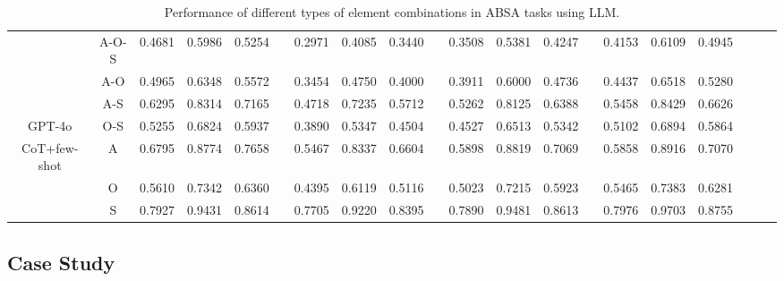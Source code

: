 \documentclass[11pt]{article}
\begin{document}
\begin{table}[ht]
{\begin{tabular}{cccccccccccccccccccc}
    \midrule
          & A-O-S & 0.4681 & 0.5986 & 0.5254 &       & 0.2971 & 0.4085 & 0.3440 &       & 0.3508 & 0.5381 & 0.4247 &       & 0.4153 & 0.6109 & 0.4945 \\
          & A-O   & 0.4965 & 0.6348 & 0.5572 &       & 0.3454 & 0.4750 & 0.4000   &       & 0.3911 & 0.6000   & 0.4736 &       & 0.4437 & 0.6518 & 0.5280 \\
          & A-S   & 0.6295 & 0.8314 & 0.7165 &       & 0.4718 & 0.7235 & 0.5712 &       & 0.5262 & 0.8125 & 0.6388 &       & 0.5458 & 0.8429 & 0.6626 \\
          GPT-4o & O-S   & 0.5255 & 0.6824 & 0.5937 &       & 0.3890 & 0.5347 & 0.4504 &       & 0.4527 & 0.6513 & 0.5342 &       & 0.5102 & 0.6894 & 0.5864 \\
          CoT+few-shot & A     & 0.6795 & 0.8774 & 0.7658 &       & 0.5467 & 0.8337 & 0.6604 &       & 0.5898 & 0.8819 & 0.7069 &       & 0.5858 & 0.8916 & 0.7070 \\
          & O     & 0.5610 & 0.7342 & 0.6360 &       & 0.4395 & 0.6119 & 0.5116 &       & 0.5023 & 0.7215 & 0.5923 &       & 0.5465 & 0.7383 & 0.6281 \\
          & S     & 0.7927 & 0.9431 & 0.8614 &       & 0.7705 & 0.9220 & 0.8395 &       & 0.7890 & 0.9481 & 0.8613 &       & 0.7976 & 0.9703 & 0.8755 \\
   
    \bottomrule
    \hline
    \end{tabular}
}
    \caption{Performance of different types of element combinations in ABSA tasks using LLM.
}
\label{tab:gpt-results}
\end{table}


\subsection{Case Study}
\label{sec:Case Study}
\end{document}
